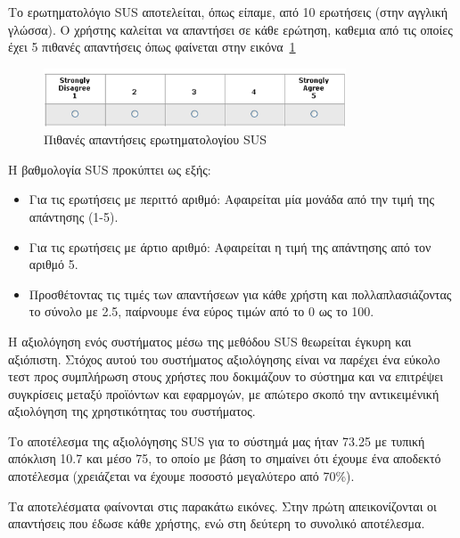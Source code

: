 Το ερωτηματολόγιο SUS αποτελείται, όπως είπαμε, από 10 ερωτήσεις (στην αγγλική γλώσσα). Ο χρήστης καλείται να απαντήσει σε κάθε ερώτηση, καθεμια από τις οποίες έχει 5 πιθανές απαντήσεις όπως φαίνεται στην εικόνα~\ref{fig:answers}


\begin{figure}[H]
    \centering
    \includegraphics[width=0.8\textwidth]{Files/Figures/sus-responses.png}
    \caption[Πιθανές απαντήσεις ερωτηματολογίου SUS]{Πιθανές απαντήσεις ερωτηματολογίου SUS}
    \label{fig:answers}
\end{figure}




Η βαθμολογία SUS προκύπτει ως εξής:
\begin{itemize}
\item Για τις ερωτήσεις με περιττό αριθμό: Αφαιρείται μία μονάδα από την τιμή της απάντησης (1-5).
\item Για τις ερωτήσεις με άρτιο αριθμό: Αφαιρείται η τιμή της απάντησης από τον αριθμό 5.
\item  Προσθέτοντας τις τιμές των απαντήσεων για κάθε χρήστη και πολλαπλασιάζοντας το σύνολο με 2.5, παίρνουμε ένα εύρος τιμών από το 0 ως το 100.
\end{itemize}




Η αξιολόγηση ενός συστήματος μέσω της μεθόδου SUS θεωρείται έγκυρη και αξιόπιστη. Στόχος αυτού του συστήματος αξιολόγησης είναι να παρέχει ένα εύκολο τεστ προς συμπλήρωση στους χρήστες που δοκιμάζουν το σύστημα και να επιτρέψει συγκρίσεις μεταξύ προϊόντων και εφαρμογών, με απώτερο σκοπό την αντικειμένική αξιολόγηση της χρηστικότητας του συστήματος. 


Το αποτέλεσμα της αξιολόγησης SUS για το σύστημά μας ήταν 73.25 με τυπική απόκλιση 10.7 και μέσο 75, το οποίο με βάση το \cite{bangor2008empirical} σημαίνει ότι έχουμε ένα αποδεκτό αποτέλεσμα (χρειάζεται να έχουμε ποσοστό μεγαλύτερο από 70\%).


Τα αποτελέσματα φαίνονται στις παρακάτω εικόνες. Στην πρώτη απεικονίζονται οι απαντήσεις που έδωσε κάθε χρήστης, ενώ στη δεύτερη το συνολικό αποτέλεσμα.

